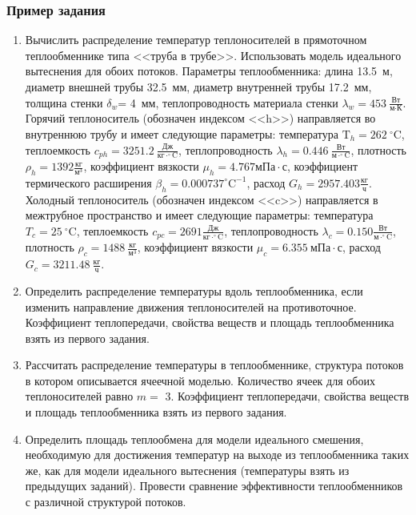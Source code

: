 \subsubsection*{Пример задания}
\begin{enumerate}
\item Вычислить распределение температур теплоносителей в прямоточном теплообменнике типа <<труба в трубе>>. Использовать модель идеального вытеснения для обоих потоков. Параметры теплообменника: длина  13.5~м, диаметр внешней трубы 32.5~мм,  диаметр внутренней трубы 17.2~мм, толщина стенки $\delta_{w}$=     4~мм,  теплопроводность материала стенки $\lambda_{w}=  453~\frac{\text{Вт}}{\text{м} \cdot \text{К}}$.  Горячий теплоноситель (обозначен индексом <<h>>) направляется во внутреннюю трубу и	 имеет следующие параметры: температура $\text{T}_{h}= 262~^\circ\mathrm{C}$, теплоемкость	  $c_{p{h}}= 3251.2~\frac{\text{Дж}}{\text{кг} \cdot ^\circ\mathrm{C}}$, теплопроводность 		$\lambda_{h}= 0.446~\frac{\text{Вт}}{\text{м} \cdot ^\circ\mathrm{C}}$, плотность 		$\rho_{h}= 1392 \frac{\text{кг}}{\text{м}^3}$, коэффициент вязкости $\mu_{h}=4.767 \text{мПа} 		\cdot \text{с} $, коэффициент термического расширения $\beta_{h}=0.000737 ^\circ\mathrm{C}^{-1}$,		 расход $G_{h}= 2957.403 \frac{\text{кг}}{\text{ч}}$. Холодный теплоноситель (обозначен индексом <<c>>) 		 направляется в межтрубное пространство и имеет следующие параметры: температура $T_{c}=   25		 ~^\circ\mathrm{C}$, теплоемкость $c_{p{c}}= 2691 \frac{\text{Дж}}{\text{кг} \cdot ^\circ\mathrm{C}}$,			 теплопроводность $\lambda_{c}=0.150 \frac{\text{Вт}}{\text{м} \cdot ^\circ\mathrm{C}}$, плотность 			 $\rho_{c}=  1488~\frac{\text{кг}}{\text{м}^3}$, коэффициент вязкости $\mu_{c}=6.355~\text{мПа} \cdot \text{с} $, 			 расход $G_{c}=3211.48~\frac{\text{кг}}{\text{ч}}$. 

\item Определить распределение температуры вдоль теплообменника, если 	изменить направление движения теплоносителей на противоточное. Коэффициент теплопередачи, свойства веществ и площадь теплообменника взять из первого задания.

\item Рассчитать распределение температуры в теплообменнике, структура потоков в котором описывается ячеечной моделью. Количество ячеек для обоих теплоносителей равно $m = $ 3. Коэффициент теплопередачи, свойства веществ и площадь теплообменника взять из первого задания.

\item Определить площадь теплообмена для модели идеального смешения, необходимую для достижения 	температур на выходе из теплообменника таких же, как для модели идеального вытеснения (температуры взять из предыдущих заданий).	Провести сравнение эффективности теплообменников с различной структурой потоков.
\end{enumerate}